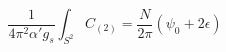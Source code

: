 \begin{equation}
\frac{1}{4\pi^2 \alpha'g_s} \int_{S^2}  C_{(2)} =  \frac{N}{2 \pi}
\left( \psi_0 + 2 \epsilon \right)
\end{equation}

